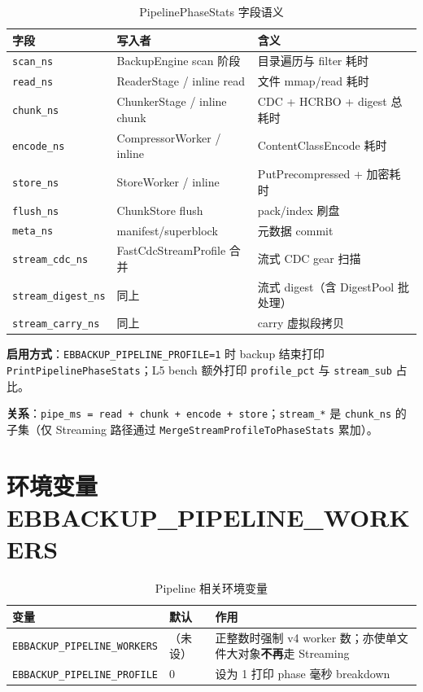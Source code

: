 \begin{table}[htbp]
\centering
\caption{PipelinePhaseStats 字段语义}
\small
\begin{tabular}{@{}llp{7.5cm}@{}}
\toprule
字段 & 写入者 & 含义 \\
\midrule
\texttt{scan\_ns} & BackupEngine scan 阶段 & 目录遍历与 filter 耗时 \\
\texttt{read\_ns} & ReaderStage / inline read & 文件 mmap/read 耗时 \\
\texttt{chunk\_ns} & ChunkerStage / inline chunk & CDC + HCRBO + digest 总耗时 \\
\texttt{encode\_ns} & CompressorWorker / inline & ContentClassEncode 耗时 \\
\texttt{store\_ns} & StoreWorker / inline & PutPrecompressed + 加密耗时 \\
\texttt{flush\_ns} & ChunkStore flush & pack/index 刷盘 \\
\texttt{meta\_ns} & manifest/superblock & 元数据 commit \\
\texttt{stream\_cdc\_ns} & FastCdcStreamProfile 合并 & 流式 CDC gear 扫描 \\
\texttt{stream\_digest\_ns} & 同上 & 流式 digest（含 DigestPool 批处理） \\
\texttt{stream\_carry\_ns} & 同上 & carry 虚拟段拷贝 \\
\bottomrule
\end{tabular}
\end{table}

\textbf{启用方式}：\texttt{EBBACKUP\_PIPELINE\_PROFILE=1} 时 backup 结束打印 \texttt{PrintPipelinePhaseStats}；L5 bench 额外打印 \texttt{profile\_pct} 与 \texttt{stream\_sub} 占比。

\textbf{关系}：\texttt{pipe\_ms = read + chunk + encode + store}；\texttt{stream\_*} 是 \texttt{chunk\_ns} 的子集（仅 Streaming 路径通过 \texttt{MergeStreamProfileToPhaseStats} 累加）。

\section{环境变量 EBBACKUP\_PIPELINE\_WORKERS}

\begin{table}[htbp]
\centering
\caption{Pipeline 相关环境变量}
\begin{tabular}{@{}llp{7cm}@{}}
\toprule
变量 & 默认 & 作用 \\
\midrule
\texttt{EBBACKUP\_PIPELINE\_WORKERS} & （未设） & 正整数时强制 v4 worker 数；亦使单文件大对象\textbf{不再}走 Streaming \\
\texttt{EBBACKUP\_PIPELINE\_PROFILE} & 0 & 设为 1 打印 phase 毫秒 breakdown \\
\bottomrule
\end{tabular}
\end{table}

